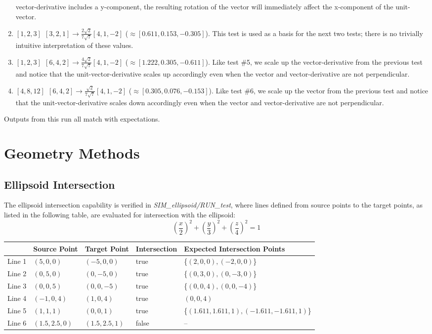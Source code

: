 \documentclass[11pt,fleqn]{report}
\begin{document}
\begin{enumerate}
vector-derivative includes a y-component, the resulting rotation of
the vector will immediately affect the x-component of the
unit-vector.
\item $[1,2,3]~~[3,2,1] \rightarrow \frac{2\sqrt2}{7\sqrt7}[4,1,-2]$
($\approx [0.611, 0.153, -0.305]$).
This test is used as a basis for the next two tests; there is no
trivially intuitive interpretation of these values.
\item $[1,2,3]~~[6,4,2] \rightarrow \frac{4\sqrt2}{7\sqrt7}[4,1,-2]$
($\approx [1.222, 0.305, -0.611]$).
Like test \#5, we scale up the vector-derivative from the previous
test and notice that the unit-vector-derivative scales up
accordingly even when the vector and vector-derivative are not
perpendicular.
\item $[4,8,12]~~[6,4,2] \rightarrow \frac{\sqrt2}{7\sqrt7}[4,1,-2]$
($\approx [0.305, 0.076, -0.153]$).
Like test \#6, we scale up the vector from the previous
test and notice that the unit-vector-derivative scales down
accordingly even when the vector and vector-derivative are not
perpendicular.
\end{enumerate}
Outputs from this run all match with expectations.

\section{Geometry Methods}
\subsection{Ellipsoid Intersection}
The ellipsoid intersection capability is verified in 
\textit{SIM\_ellipsoid/RUN\_test}, where lines defined from source 
points to the target points, as listed in the following table, are evaluated for 
intersection with the ellipsoid:
\begin{equation*}
\left( \frac{x}{2} \right)^2 +
\left( \frac{y}{3} \right)^2 +
\left( \frac{z}{4} \right)^2 = 1
\end{equation*}

\begin{center}
\begin{tabular}{|l|l|l||l|l|}
\hline
 \textbf{ } & \textbf{Source Point} & \textbf{Target Point} & \textbf{Intersection} &
 \textbf{Expected Intersection Points} \\
\hline \hline
Line 1 & $(5,0,0)$  & $(-5,0,0)$ & true & \{$(2,0,0),(-2,0,0)$\} \\
Line 2 & $(0,5,0)$  & $(0,-5,0)$ & true & \{$(0,3,0),(0,-3,0)$\} \\
Line 3 & $(0,0,5)$  & $(0,0,-5)$ & true & \{$(0,0,4),(0,0,-4)$\} \\
Line 4 & $(-1,0,4)$ & $(1,0,4)$  & true & $(0,0,4)$ \\
Line 5 & $(1,1,1)$  & $(0,0,1)$  & true & \{$(1.611, 1.611, 1),(-1.611,-1.611,1)$\} \\
Line 6 & $(1.5,2.5,0)$  & $(1.5,2.5,1)$ & false & -- \\
\hline \hline
\end{tabular}
\end{center}
\end{document}
